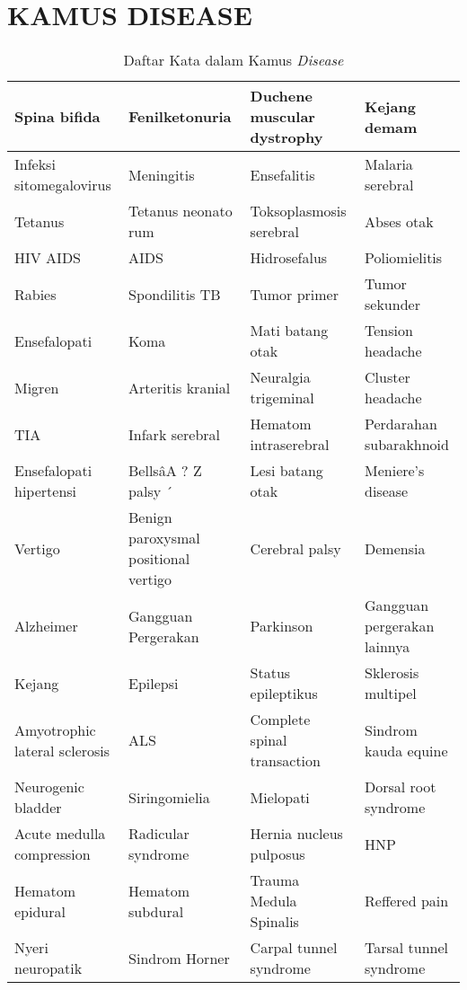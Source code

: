 \section{KAMUS DISEASE}
\begin{longtable}{|p{}|p{}|p{}|p{}|}

	\caption{Daftar Kata dalam Kamus \textit{Disease}}\label{lampiran:disease}\\
	\hline
	Spina bifida & Fenilketonuria & Duchene muscular dystrophy & Kejang demam \\ \hline
	Infeksi sitomegalovirus & Meningitis & Ensefalitis & Malaria serebral \\ \hline
	Tetanus & Tetanus neonato rum & Toksoplasmosis serebral & Abses otak \\ \hline
	HIV AIDS & AIDS & Hidrosefalus & Poliomielitis \\ \hline
	Rabies & Spondilitis TB & Tumor primer & Tumor sekunder \\ \hline
	Ensefalopati & Koma & Mati batang otak & Tension headache \\ \hline
	Migren & Arteritis kranial & Neuralgia trigeminal & Cluster headache \\ \hline
	TIA & Infark serebral & Hematom intraserebral & Perdarahan subarakhnoid \\ \hline
	Ensefalopati hipertensi & BellsâA ? Z palsy ´ & Lesi batang otak & Meniere’s disease \\ \hline
	Vertigo & Benign paroxysmal positional vertigo & Cerebral palsy & Demensia \\ \hline
	Alzheimer & Gangguan Pergerakan & Parkinson & Gangguan pergerakan lainnya \\ \hline
	Kejang & Epilepsi & Status epileptikus & Sklerosis multipel \\ \hline
	Amyotrophic lateral sclerosis & ALS & Complete spinal transaction & Sindrom kauda equine \\ \hline
	Neurogenic bladder & Siringomielia & Mielopati & Dorsal root syndrome \\ \hline
	Acute medulla compression & Radicular syndrome & Hernia nucleus pulposus & HNP \\ \hline
	Hematom epidural & Hematom subdural & Trauma Medula Spinalis & Reffered pain \\ \hline
	Nyeri neuropatik & Sindrom Horner & Carpal tunnel syndrome & Tarsal tunnel syndrome \\ \hline

\end{longtable}
